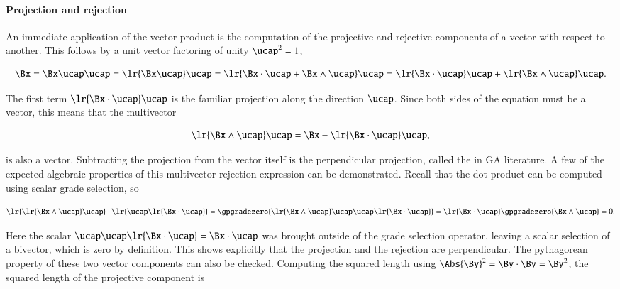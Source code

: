\paragraph{Projection and rejection}

An immediate application of the vector product is the computation of the projective and rejective components of a vector with respect to another.  This follows by a unit vector factoring of unity \( \ucap^2 = 1 \),

\begin{dmath}\label{eqn:SimpleProducts2:680}
\Bx =
\Bx \ucap \ucap
=
\lr{ \Bx \ucap } \ucap
=
\lr{ \Bx \cdot \ucap + \Bx \wedge \ucap } \ucap
=
\lr{ \Bx \cdot \ucap } \ucap + \lr{ \Bx \wedge \ucap } \ucap.
\end{dmath}

The first term \( \lr{ \Bx \cdot \ucap } \ucap \) is the familiar projection along the direction \( \ucap \).  Since both sides of the equation must be a vector, this means that the multivector

\begin{dmath}\label{eqn:SimpleProducts2:700}
\lr{ \Bx \wedge \ucap } \ucap
=\Bx - \lr{ \Bx \cdot \ucap } \ucap,
\end{dmath}

is also a vector.  Subtracting the projection from the vector itself is the perpendicular projection, called the  in GA literature.  A few of the expected algebraic properties of this multivector rejection expression can be demonstrated.  Recall that the dot product can be computed using scalar grade selection, so

\begin{dmath}\label{eqn:SimpleProducts2:720}
\lr{ \lr{ \Bx \wedge \ucap } \ucap } \cdot \lr{ \ucap \lr{ \Bx \cdot \ucap } }
=
\gpgradezero{ \lr{ \Bx \wedge \ucap } \ucap \ucap \lr{ \Bx \cdot \ucap } }
=
\lr{ \Bx \cdot \ucap }
\gpgradezero{ \Bx \wedge \ucap }
= 0.
\end{dmath}

Here the scalar \( \ucap \ucap \lr{ \Bx \cdot \ucap } = \Bx \cdot \ucap \) was brought outside of the grade selection operator, leaving a scalar selection of a bivector, which is zero by definition.  This shows explicitly that the projection and the rejection are perpendicular.  The pythagorean property of these two vector components can also be checked.  Computing the squared length using \( \Abs{\By}^2 = \By \cdot \By = \By^2 \), the squared length of the projective component is

